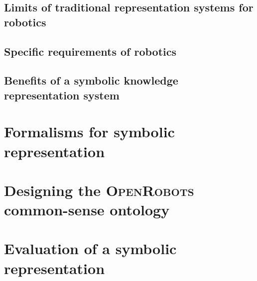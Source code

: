 \subsection{Limits of traditional representation systems for robotics}
\label{subssect|limits}

\subsection{Specific requirements of robotics}
\label{subssect|robotics-specifics}

\subsection{Benefits of a symbolic knowledge representation system}
\label{subssect|krs-benefits}

\section{Formalisms for symbolic representation}
\label{sect|formalisms}

\section{Designing the \textsc{OpenRobots} common-sense ontology}
\label{sect|commonsense-design}

\section{Evaluation of a symbolic representation }
\label{sect|krs-evaluation}

